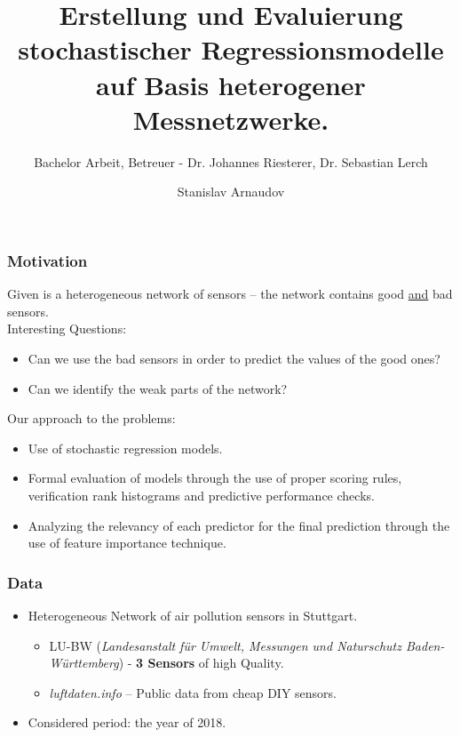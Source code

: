 \documentclass[18pt]{beamer}
\title[Short title]{Erstellung und Evaluierung stochastischer Regressionsmodelle auf Basis heterogener Messnetzwerke.}
\subtitle{Bachelor Arbeit, Betreuer - Dr. Johannes Riesterer, Dr. Sebastian Lerch}
\author{Stanislav Arnaudov}
\institute{TECO - Das Telecooperation Office}
\begin{document}
 



\begin{frame}
 \titlepage
\end{frame}

\begin{frame}
  \frametitle{Motivation}
  
  Given is a heterogeneous network of sensors -- the network contains good \underline{and} bad sensors.\\
  Interesting Questions:
  \begin{itemize}
  \item Can we use the bad sensors in order to predict the values of the good ones?
  \item Can we identify the weak parts of the network?
  \end{itemize}
  Our approach to the problems:
  \begin{itemize}
  \item Use of stochastic regression models.
  \item Formal evaluation of models through the use of proper scoring rules, verification rank histograms and predictive performance checks.
    \item Analyzing the relevancy of each predictor for the final prediction through the use of feature importance technique.
  \end{itemize}
  
\end{frame}

\begin{frame}
  \frametitle{Data}

  \begin{itemize}
  \item Heterogeneous Network of air pollution sensors in Stuttgart.\\
    \begin{itemize}
    \item LU-BW (\textit{Landesanstalt für Umwelt, Messungen und Naturschutz Baden-Württemberg}) - \textbf{3 Sensors} of high Quality.
    \item \textit{luftdaten.info} -- Public data from cheap DIY sensors.
    \end{itemize}
    \item Considered period: the year of 2018.
  \end{itemize}

\end{frame}
\end{document}
